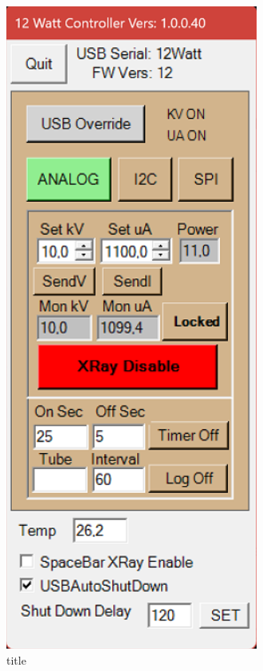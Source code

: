     \begin{figure}
        \centering
        \begin{subfigure}{.3\textwidth}
            \includegraphics{pictures/12WattController_10kV_1100uA.png}
            \caption[short]{title}%
            \label{subfig:12WattController 10kV}
        \end{subfigure}
        \hspace{10mm}
        \begin{subfigure}{.3\textwidth}
            \centering

\end{subfigure}
\end{figure}
